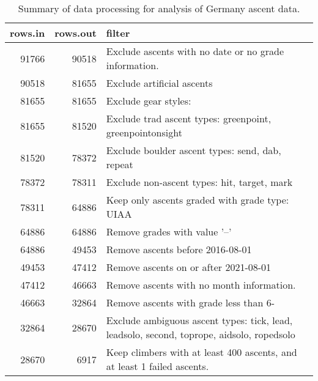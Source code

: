 \begin{table}[ht]
\centering
\begingroup\fontsize{9pt}{10pt}\selectfont
\begin{tabular}{rrl}
  \hline
{\bf rows.in} & {\bf rows.out} & {\bf filter} \\ 
  \hline
91766 & 90518 & Exclude ascents with no date or no grade information. \\ 
  90518 & 81655 & Exclude artificial ascents \\ 
  81655 & 81655 & Exclude gear styles:  \\ 
  81655 & 81520 & Exclude trad ascent types: greenpoint, greenpointonsight \\ 
  81520 & 78372 & Exclude boulder ascent types: send, dab, repeat \\ 
  78372 & 78311 & Exclude non-ascent types: hit, target, mark \\ 
  78311 & 64886 & Keep only ascents graded with grade type: UIAA \\ 
  64886 & 64886 & Remove grades with value '--' \\ 
  64886 & 49453 & Remove ascents before 2016-08-01 \\ 
  49453 & 47412 & Remove ascents on or after 2021-08-01 \\ 
  47412 & 46663 & Remove ascents with no month information. \\ 
  46663 & 32864 & Remove ascents with grade less than 6- \\ 
  32864 & 28670 & Exclude ambiguous ascent types: tick, lead, leadsolo, second, toprope, aidsolo, ropedsolo \\ 
  28670 & 6917 & Keep climbers with at least 400 ascents, and at least 1 failed ascents. \\ 
   \hline
\end{tabular}
\endgroup
\caption{Summary of data processing for analysis of Germany ascent data.} 
\label{table-data-processing-germany}
\end{table}
